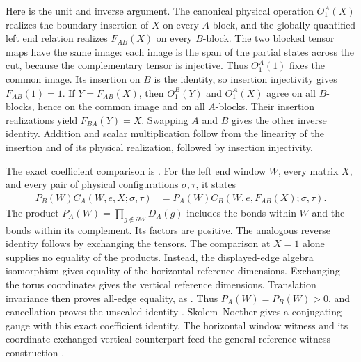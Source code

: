 \documentclass{article}
\begin{document}
Here is the unit and inverse argument. The canonical physical operation
$O_1^A(X)$ realizes the boundary insertion of $X$ on every $A$-block,
and the globally quantified left end relation realizes $F_{AB}(X)$ on
every $B$-block. The two blocked tensor maps have the same image: each
image is the span of the partial states across the cut, because the
complementary tensor is injective. Thus $O_1^A(1)$ fixes the common
image. Its insertion on $B$ is the identity, so insertion injectivity
gives $F_{AB}(1)=1$. If $Y=F_{AB}(X)$, then $O_1^B(Y)$ and
$O_1^A(X)$ agree on all $B$-blocks, hence on the common image and on all
$A$-blocks. Their insertion realizations yield $F_{BA}(Y)=X$.
Swapping $A$ and $B$ gives the other inverse identity. Addition and
scalar multiplication follow from the linearity of the insertion and
of its physical realization, followed by insertion injectivity.

The exact coefficient comparison is
.
For the left end window $W$, every matrix $X$, and every pair of physical
configurations $\sigma,\tau$, it states
\begin{align}
 P_B(W)C_A(W,e,X;\sigma,\tau)
 &=P_A(W)C_B(W,e,F_{AB}(X);\sigma,\tau).
 \label{eq:peps_gap_normalized_coefficients}
\end{align}
The product $P_A(W)=\prod_{g\notin\partial W}D_A(g)$ includes the
bonds within $W$ and the bonds within its complement. Its factors are
positive. The analogous reverse identity follows by exchanging the
tensors. The comparison at $X=1$ alone supplies no equality of the products.
Instead, the displayed-edge algebra isomorphism gives equality of the
horizontal reference dimensions. Exchanging the torus coordinates gives
the vertical reference dimensions. Translation invariance then proves
all-edge equality, as
.
Thus $P_A(W)=P_B(W)>0$, and cancellation proves the unscaled identity
.
Skolem--Noether gives a conjugating gauge with this exact coefficient
identity. The horizontal window witness and its coordinate-exchanged
vertical counterpart feed the general reference-witness construction
.
\end{document}
